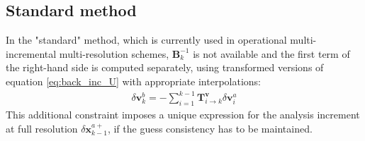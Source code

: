 \documentclass[npg, manuscript]{copernicus}
\begin{document}
\subsection{Standard method}
In the "standard" method, which is currently used in operational multi-incremental multi-resolution schemes, $\mathbf{B}_k^{-1}$ is not available and the first term of the right-hand side is computed separately, using transformed versions of equation \eqref{eq:back_inc_U} with appropriate interpolations:
\begin{align}
\label{eq:back_inc_Uvar}
\delta \mathbf{v}^b_k = - \sum_{i=1}^{k-1} \mathbf{T}^\mathbf{v}_{i \rightarrow k} \delta \mathbf{v}^a_i
\end{align}
This additional constraint imposes a unique expression for the analysis increment at full resolution $\delta \mathbf{x}^{a+}_{k-1}$, if the guess consistency has to be maintained.
\end{document}
